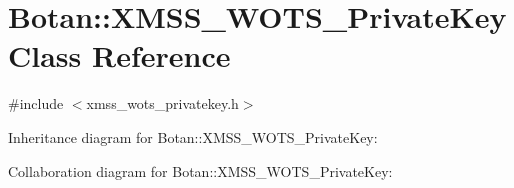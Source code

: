 \hypertarget{class_botan_1_1_x_m_s_s___w_o_t_s___private_key}{}\section{Botan\+:\+:X\+M\+S\+S\+\_\+\+W\+O\+T\+S\+\_\+\+Private\+Key Class Reference}
\label{class_botan_1_1_x_m_s_s___w_o_t_s___private_key}


{\ttfamily \#include $<$xmss\+\_\+wots\+\_\+privatekey.\+h$>$}



Inheritance diagram for Botan\+:\+:X\+M\+S\+S\+\_\+\+W\+O\+T\+S\+\_\+\+Private\+Key\+:


Collaboration diagram for Botan\+:\+:X\+M\+S\+S\+\_\+\+W\+O\+T\+S\+\_\+\+Private\+Key\+:
